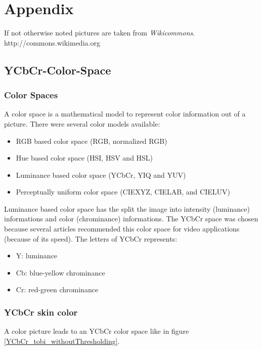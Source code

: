 \documentclass[Bachelorarbeit.tex]{subfiles}
\begin{document}
\chapter{Appendix}
If not otherwise noted pictures are taken from \textit{Wikicommons}. http://commons.wikimedia.org
\section{YCbCr-Color-Space}  	
\subsection{Color Spaces}
A color space is a mathematical model to represent color information out of a picture. There were several color models available:
\begin{itemize}
\item RGB based color space (RGB, normalized RGB)
\item Hue based color space (HSI, HSV and HSL)
\item Luminance based color space (YCbCr, YIQ and YUV)
\item Perceptually uniform color space (CIEXYZ, CIELAB, and CIELUV)
\end{itemize}

Luminance based color space has the split the image into intensity (luminance) informations and color (chrominance) informations. The YCbCr space was chosen because several articles recommended this color space for video applications (because of its speed).
\medskip
The letters of YCbCr represents:
\begin{itemize}
\item Y: luminance
\item Cb: blue-yellow chrominance
\item Cr: red-green chrominance
\end{itemize}



\newpage
\subsection{YCbCr skin color}
A color picture leads to an YCbCr color space like in figure \ref{YCbCr_tobi_withoutThresholding}.
\end{document}
